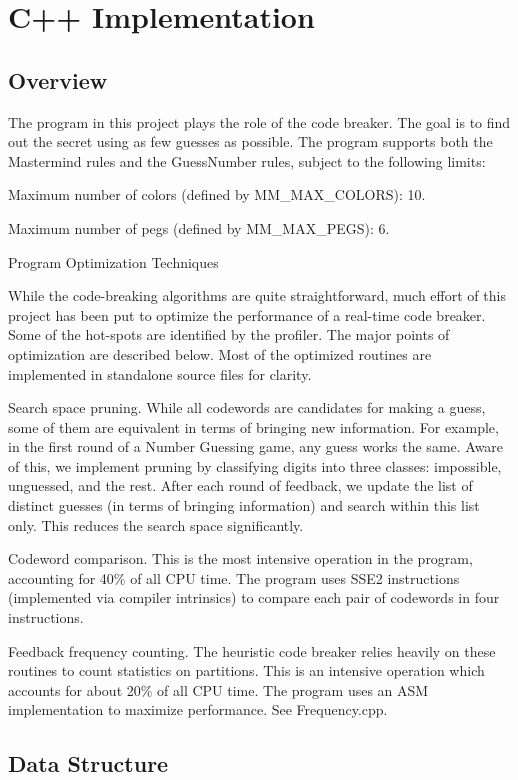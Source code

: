 \chapter{C++ Implementation}

\section{Overview}

The program in this project plays the role of the code breaker. The goal is to find out the secret using as few guesses as possible. The program supports both the Mastermind rules and the GuessNumber rules, subject to the following limits:

Maximum number of colors (defined by MM\_MAX\_COLORS): 10.

Maximum number of pegs (defined by MM\_MAX\_PEGS): 6.

Program Optimization Techniques

While the code-breaking algorithms are quite straightforward, much effort of this project has been put to optimize the performance of a real-time code breaker. Some of the hot-spots are identified by the profiler. The major points of optimization are described below. Most of the optimized routines are implemented in standalone source files for clarity.

Search space pruning. While all codewords are candidates for making a guess, some of them are equivalent in terms of bringing new information. For example, in the first round of a Number Guessing game, any guess works the same. Aware of this, we implement pruning by classifying digits into three classes: impossible, unguessed, and the rest. After each round of feedback, we update the list of distinct guesses (in terms of bringing information) and search within this list only. This reduces the search space significantly.

Codeword comparison. This is the most intensive operation in the program, accounting for 40\% of all CPU time. The program uses SSE2 instructions (implemented via compiler intrinsics) to compare each pair of codewords in four instructions.

Feedback frequency counting. The heuristic code breaker relies heavily on these routines to count statistics on partitions. This is an intensive operation which accounts for about 20\% of all CPU time. The program uses an ASM implementation to maximize performance. See Frequency.cpp.

\section{Data Structure}

